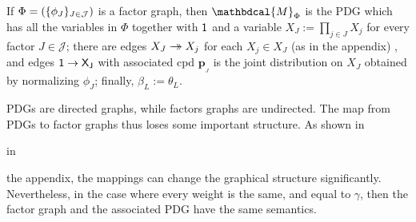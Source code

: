 \documentclass{article}
\theoremstyle{plain}
\newtheorem{prop}[theorem]{Proposition}
\theoremstyle{definition}
\theoremstyle{remark}
\newcommand\mat[1]{\mathbf{#1}}
\newcommand{\commentout}[1]{\ignorespaces}
\newcommand{\tto}{\rightarrow\mathrel{\mspace{-15mu}}\rightarrow}
\newcommand{\bp}[1][L]{\mat{p}_{\!_{#1}\!}}
\newcommand{\dg}[1]{\mathbdcal{#1}}
\newcommand{\PDGof}[1]{{\dg M}_{#1}}
\numberwithin{equation}{section}
\begin{document}
\begin{defn} \label{def:fg2PDG}
If $\Phi=(\{\phi_J\}_{J \in \cal J})$ is a factor graph, then 
$\PDGof{\Phi}$ is the PDG which has all the variables in $\Phi$
together with $\sf 1$ and a variable
$X_J := \prod_{j \in J} X_j$ for every factor $J \in \mathcal J$;
there are edges $X_J \tto X_j$ for each $X_j \in X_J$
(as in the appendix)
, and edges $\sf 1 \to X_J$ with
associated cpd $\bp[J]$ is the joint distribution on $X_J$ obtained by
normalizing $\phi_J$; finally, $\beta_L := \theta_L$.
\end{defn}

PDGs are directed graphs, while factors graphs are undirected.  The
map from PDGs to factor graphs thus loses some important structure.
As shown in 
\begin{vfull}
 in
\end{vfull}
the appendix,
the mappings can change the graphical structure significantly.
Nevertheless, in the case where every weight is the same, and equal to $\gamma$,
then the factor graph and the associated PDG have the same semantics.  

\commentout{
	\begin{prop}[restate=propfgpdglossless]%
		$\Phi \circ \PDGof = \mathrm{Id}_{\text{FG}}$. That is, if $F$ is a factor graph, then $\Pr_{\Phi(\PDGof{F})} = \Pr_F$.
	\end{prop}
}
\end{document}

